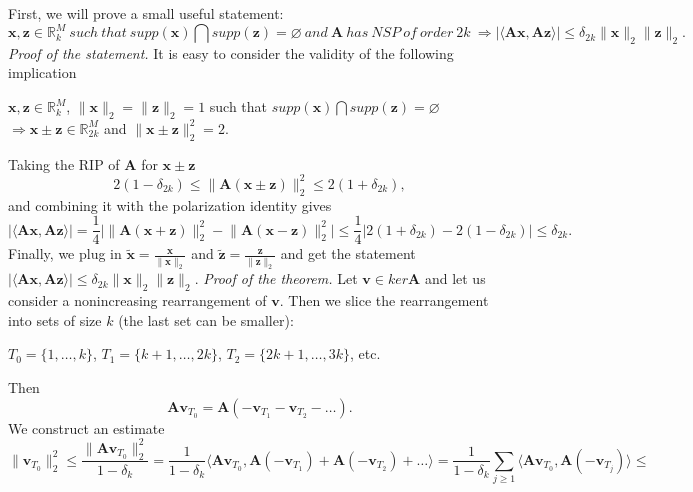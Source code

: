 \documentclass[11pt,oneside,czech,american]{book} %
\theoremstyle{plain}
\theoremstyle{definition}
\begin{document}
First, we will prove a small useful statement:
\begin{equation}
	\bm{x},\bm{z} \in \mathbb{R}^{M}_k \ such \ that \ supp(\bm{x}) \bigcap supp(\bm{z}) = \varnothing \ and \ \bm{A} \ has \ NSP \ of \ order \ 2k \ \Rightarrow |\langle\bm{Ax},\bm{Az}\rangle| \leq \delta_{2k} \lVert \bm{x} \rVert_2 \lVert \bm{z} \rVert_2. \label{statement}
\end{equation}
\emph{Proof of the statement.} It is easy to consider the validity of the following implication
\begin{center}
	$\bm{x},\bm{z} \in \mathbb{R}^{M}_k$, $\lVert \bm{x} \rVert_2 = \lVert \bm{z} \rVert_2 = 1$ such that $supp(\bm{x}) \bigcap supp(\bm{z}) = \varnothing$ $\Rightarrow \bm{x} \pm \bm{z} \in \mathbb{R}^{M}_{2k}$ and $\lVert \bm{x} \pm \bm{z} \rVert_2^2 = 2$.
\end{center}
Taking the RIP of $\bm{A}$ for $\bm{x} \pm \bm{z}$
\begin{equation*}
	2(1-\delta_{2k})\leq \lVert\bm{A}( \bm{\bm{x} \pm \bm{z}})\rVert_{2}^2 \leq 2(1+\delta_{2k}),
\end{equation*}
and combining it with the polarization identity gives
\begin{equation*}
	|\langle\bm{Ax},\bm{Az}\rangle| = \frac{1}{4} \Big|\lVert \bm{A}(\bm{x}+\bm{z})\rVert_2^{2} - \lVert \bm{A}(\bm{x}-\bm{z})\rVert_2^{2}\Big|\leq \frac{1}{4} \Big| 2(1+\delta_{2k}) - 2(1-\delta_{2k})\Big| \leq \delta_{2k}.
\end{equation*}
Finally, we plug in $\tilde{\bm{x}} = \frac{\bm{x}}{\lVert \bm{x}\rVert_2}$ and $\tilde{\bm{z}} = \frac{\bm{z}}{\lVert \bm{z}\rVert_2}$ and get the statement $|\langle\bm{Ax},\bm{Az}\rangle| \leq \delta_{2k} \lVert \bm{x} \rVert_2 \lVert \bm{z} \rVert_2$.
\newline
\newline
\emph{Proof of the theorem.}
Let $\bm{v} \in ker \bm{A}$ and let us consider a nonincreasing rearrangement of $\bm{v}$. Then we slice the rearrangement into sets of size $k$ (the last set can be smaller):
\begin{center}
	$T_0 = \{1, \dots, k\}$, $T_1 = \{k+1, \dots, 2k\}$, $T_2 = \{2k+1, \dots, 3k\}$, etc.
\end{center}
Then
\begin{equation}
	\bm{A}\bm{v}_{T_0} = \bm{A}(-\bm{v}_{T_1}-\bm{v}_{T_2}- \dots). \label{something}
\end{equation}
We construct an estimate
\begin{equation*}
	\lVert\bm{v}_{T_0}\rVert_2^{2} \leq \frac{\lVert\bm{Av}_{T_0}\rVert_2^{2}}{1-\delta_k} = \frac{1}{{1-\delta_k}}\langle\bm{A}\bm{v}_{T_0},\bm{A}(-\bm{v}_{T_1})+\bm{A}(-\bm{v}_{T_2}) + \dots\rangle = \frac{1}{{1-\delta_k}} \sum_{j\geq 1}\langle\bm{A}\bm{v}_{T_0},\bm{A}(-\bm{v}_{T_j}) \rangle \leq
\end{equation*}
\end{document}
